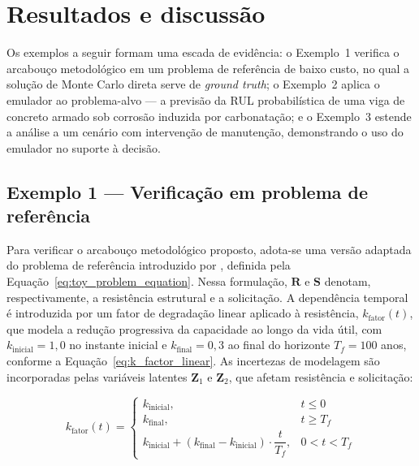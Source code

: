 \section{Resultados e discuss\~ao}\label{sec:resultados}


Os exemplos a seguir formam uma escada de evidência: o Exemplo~1 verifica o arcabouço metodológico em um problema de referência de baixo custo, no qual a solução de Monte Carlo direta serve de \textit{ground truth}; o Exemplo~2 aplica o emulador ao problema-alvo --- a previsão da RUL probabilística de uma viga de concreto armado sob corrosão induzida por carbonatação; e o Exemplo~3 estende a análise a um cenário com intervenção de manutenção, demonstrando o uso do emulador no suporte à decisão.

\subsection{Exemplo 1 --- Verifica\c{c}\~ao em problema de refer\^encia}
\label{subsec:exemplo1}

Para verificar o arcabouço metodológico proposto, adota-se uma versão adaptada do problema de referência introduzido por \textcite{pires2024}, definida pela Equação~\eqref{eq:toy_problem_equation}. Nessa formulação, $\mathbf{R}$ e $\mathbf{S}$ denotam, respectivamente, a resistência estrutural e a solicitação. A dependência temporal é introduzida por um fator de degradação linear aplicado à resistência, $k_{\mathrm{fator}}(t)$, que modela a redução progressiva da capacidade ao longo da vida útil, com $k_{\mathrm{inicial}} = 1{,}0$ no instante inicial e $k_{\mathrm{final}} = 0{,}3$ ao final do horizonte $T_f = 100$ anos, conforme a Equação~\eqref{eq:k_factor_linear}. As incertezas de modelagem são incorporadas pelas variáveis latentes $\mathbf{Z}_1$ e $\mathbf{Z}_2$, que afetam resistência e solicitação:

\begin{equation}
k_{\mathrm{fator}}(t) =
\begin{cases}
k_{\mathrm{inicial}}, & t \leq 0 \\[5pt]
k_{\mathrm{final}}, & t \geq T_f \\[5pt]
k_{\mathrm{inicial}} + (k_{\mathrm{final}} - k_{\mathrm{inicial}}) \cdot \dfrac{t}{T_f}, & 0 < t < T_f
\end{cases}
\label{eq:k_factor_linear}
\end{equation}

